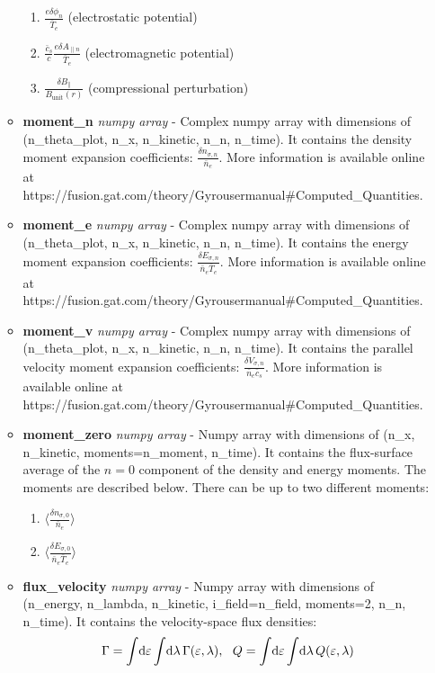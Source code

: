 \documentclass{article}
\begin{document}
\begin{itemize}
\begin{itemize}
\begin{enumerate}
\item $\frac{e\delta\phi_n}{\bar{T}_e}$ (electrostatic potential)
\item $\frac{\bar{c}_s}{c}\frac{e\delta A_{\parallel n}}{\bar{T}_e}$ (electromagnetic potential)
\item $\frac{\delta B_\parallel}{B_{\mathrm{unit}}(r)}$ (compressional perturbation)
\end{enumerate}
\item \textbf{moment\_n}\emph{ numpy array} - Complex numpy array with dimensions of (n\_theta\_plot, n\_x, n\_kinetic, n\_n, n\_time).  It contains the density moment expansion coefficients: $\frac{\delta n_{\sigma,n}}{\bar{n}_e}$.  More information is available online at https://fusion.gat.com/theory/Gyrousermanual\#Computed\_Quantities.
\item \textbf{moment\_e}\emph{ numpy array} - Complex numpy array with dimensions of (n\_theta\_plot, n\_x, n\_kinetic, n\_n, n\_time).  It contains the energy moment expansion coefficients: $\frac{\delta E_{\sigma,n}}{\bar{n}_e\bar{T}_e}$.  More information is available online at https://fusion.gat.com/theory/Gyrousermanual\#Computed\_Quantities.
\item \textbf{moment\_v}\emph{ numpy array} - Complex numpy array with dimensions of (n\_theta\_plot, n\_x, n\_kinetic, n\_n, n\_time).  It contains the parallel velocity moment expansion coefficients: $\frac{\delta V_{\sigma,n}}{\bar{n}_e\bar{c}_s}$.  More information is available online at https://fusion.gat.com/theory/Gyrousermanual\#Computed\_Quantities.
\item \textbf{moment\_zero}\emph{ numpy array} - Numpy array with dimensions of (n\_x, n\_kinetic, moments=n\_moment, n\_time).  It contains the flux-surface average of the $n=0$ component of the density and energy moments.  The moments are described below.  There can be up to two different moments:
\begin{enumerate}
\item $\langle\frac{\delta n_{\sigma,0}}{\bar{n}_e}\rangle$
\item $\langle\frac{\delta E_{\sigma,0}}{\bar{n}_e\bar{T}_e}\rangle$
\end{enumerate}
\item \textbf{flux\_velocity}\emph{ numpy array} - Numpy array with dimensions of (n\_energy, n\_lambda, n\_kinetic, i\_field=n\_field, moments=2, n\_n, n\_time).  It contains the velocity-space flux densities: $$\Gamma=\int \! \dif \varepsilon \int \! \dif \lambda \, \Gamma(\varepsilon, \lambda), \, \, \, \, Q=\int \! \dif \varepsilon \int \! \dif \lambda \, Q(\varepsilon, \lambda)$$

\end{itemize}
\end{itemize}
\end{document}
